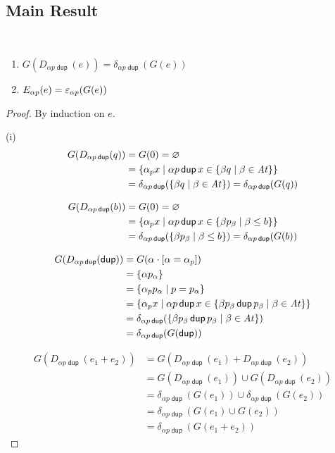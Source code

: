 \documentclass{article}
\newcommand\cset[1]{\{#1\}}
\newcommand\At{\ensuremath{\mathit{At}}}
\newcommand\pdup{\mathop{\mathsf{dup}}}
\newcommand\bval[1]{[#1]}
\begin{document}
\subsection*{Main Result}

\begin{lemma}\ 
\begin{enumerate}
\romanize
\item
$G(D_{\alpha p\pdup}(e)) = \delta_{\alpha p\pdup}(G(e))$
\item
$E_{\alpha p}(e) = \varepsilon_{\alpha p}(G(e))$
\end{enumerate}
\end{lemma}

\begin{proof}
By induction on $e$.

(i)
\begin{align*}
G(D_{\alpha p\pdup}(q))
&= G(0)
= \emptyset\\
&= \set{\alpha_p x}{\alpha p\pdup x\in\set{\beta q}{\beta\in\At}}\\
&= \delta_{\alpha p\pdup}(\set{\beta q}{\beta\in\At})
= \delta_{\alpha p\pdup}(G(q))
\end{align*}

\begin{align*}
G(D_{\alpha p\pdup}(b))
&= G(0)
= \emptyset\\
&= \set{\alpha_p x}{\alpha p\pdup x\in\set{\beta p_\beta}{\beta\leq b}}\\
&= \delta_{\alpha p\pdup}(\set{\beta p_\beta}{\beta\leq b})
= \delta_{\alpha p\pdup}(G(b))
\end{align*}

\begin{align*}
G(D_{\alpha p\pdup}(\pdup))
&= G(\alpha\cdot\bval{\alpha=\alpha_p})\\
&= \cset{\alpha p_\alpha}\\
&= \set{\alpha_p p_\alpha}{p=p_\alpha}\\
&= \set{\alpha_p x}{\alpha p\pdup x\in\set{\beta p_\beta\pdup p_\beta}{\beta\in\At}}\\
&= \delta_{\alpha p\pdup}(\set{\beta p_\beta\pdup p_\beta}{\beta\in\At})\\
&= \delta_{\alpha p\pdup}(G(\pdup))
\end{align*}

\begin{align*}
G(D_{\alpha p\pdup}(e_1+e_2))
&= G(D_{\alpha p\pdup}(e_1)+D_{\alpha p\pdup}(e_2))\\
&= G(D_{\alpha p\pdup}(e_1))\cup G(D_{\alpha p\pdup}(e_2))\\
&= \delta_{\alpha p\pdup}(G(e_1))\cup\delta_{\alpha p\pdup}(G(e_2))\\
&= \delta_{\alpha p\pdup}(G(e_1)\cup G(e_2))\\
&= \delta_{\alpha p\pdup}(G(e_1+e_2))
\end{align*}


\end{proof}
\end{document}
